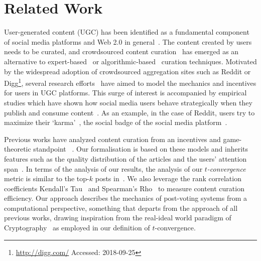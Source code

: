 \section{Related Work}
User-generated content (UGC) has been identified as a fundamental component of social media platforms and Web 2.0 in general~\cite{kaplan2010users}. The content created by users needs to be curated, and crowdsourced content curation~\cite{askalidis2013theoretical} has emerged as an alternative to expert-based~\cite{stanoevska2012content} or algorithmic-based~\cite{rader2015understanding} curation techniques. Motivated by the widespread adoption of crowdsourced aggregation sites such as Reddit or Digg\footnote{\url{http://digg.com/} Accessed: 2018-09-25}, several research efforts~\cite{das2010ranking,ghosh2011incentivizing,abbassi2014distributed} have aimed to model the mechanics and incentives for users in UGC platforms. This surge of interest is accompanied by empirical studies which have shown how
social media users behave strategically when they publish and consume content~\cite{may2014filter}. As an example, in the case of Reddit, users try to maximize their `karma'~\cite{bergstrom2011don}, the social badge of the social media platform~\cite{anderson2013steering}.

Previous works have analyzed content curation from an incentives and game-theoretic standpoint~\cite{ghosh2011incentivizing,das2010ranking,gupte2009news,may2014filter,abbassi2014distributed} . Our formalisation is based on these models and inherits features such as the quality distribution of the articles and the users' attention span~\cite{askalidis2013theoretical,ghosh2011incentivizing}. In terms of the analysis of  our results, the analysis of our \textit{$t$-convergence} metric is similar to the top-$k$ posts in~\cite{askalidis2013theoretical}. We also leverage the rank correlation coefficients Kendall's Tau~\cite{kendall1955rank} and Spearman's Rho~\cite{spearman1904proof} to measure content curation efficiency. 
Our approach describes the mechanics of post-voting systems from a computational perspective, something that departs from the approach of all previous works, drawing inspiration from the real-ideal world paradigm of Cryptography~\cite{goldreich1999foundations,lindell} as employed in our definition of $t$-convergence. 


